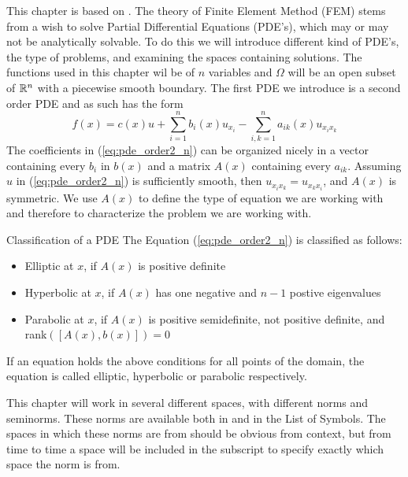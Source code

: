 This chapter is based on \cite{Braess}.
The theory of Finite Element Method (FEM) stems from a 
wish to solve Partial Differential Equations (PDE's),
which may or may not be analytically solvable. 
To do this we will introduce different kind of PDE's, 
the type of
problems, and examining the spaces containing solutions. 
The functions used in this chapter wil be of $n$ 
variables and $\Omega$ will be 
an open subset of $\mathbb{R}^n$ with a piecewise smooth boundary.
The first PDE we introduce is a second order PDE and as 
such has the form
\begin{equation}
	f(x) = c(x) u + \sum_{i=1}^{n}b_i(x)u_{x_{i}}
	- \sum_{i,k=1}^{n}a_{ik}(x)u_{x_i x_k}\label{eq:pde_order2_n}
\end{equation}
The coefficients in (\ref*{eq:pde_order2_n}) can be 
organized nicely in a vector containing every $b_i$ 
in $b(x)$
and a matrix $A(x)$ containing every $a_{ik}$.
Assuming $u$ in (\ref*{eq:pde_order2_n}) is sufficiently 
smooth, then $u_{x_i x_k} =u_{x_k x_i} $, and $A(x)$ is 
symmetric. 
We use $A(x)$ to define the type of equation we are working 
with and therefore to characterize the problem we are 
working with.
\begin{defn}{Classification of a PDE}
	The Equation (\ref{eq:pde_order2_n}) is classified as follows:
	\begin{itemize}
		\item Elliptic at $x$, if $A(x)$ is positive definite
		\item Hyperbolic at $x$, if $A(x)$ has one negative and $n-1$ postive eigenvalues
		\item Parabolic at $x$, if $A(x)$ is positive semidefinite, not positive definite, and rank$([A(x), b(x)])=0$
	\end{itemize}
	If an equation holds the above conditions for all points of the domain, the equation is called elliptic, hyperbolic or parabolic respectively.
\end{defn}
This chapter will work in several different spaces, with different norms and 
seminorms. 
These norms are available both in \cite{Braess} and in the List of Symbols. 
The spaces in which these norms are from should be obvious from context, but from 
time to time a space will be included in the subscript to specify exactly which 
space the norm is from.